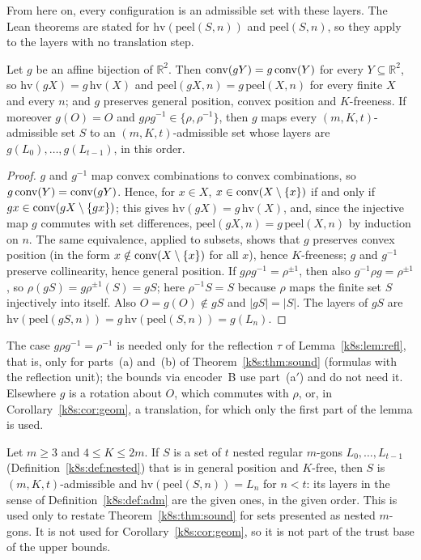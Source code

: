 From here on, every configuration is an admissible set with these layers. The Lean theorems are stated for
$\mathrm{hv}(\mathrm{peel}(S,n))$ and $\mathrm{peel}(S,n)$, so they apply to the layers with no translation step.

\begin{lemma}\label{k8s:lem:affine}
Let $g$ be an affine bijection of $\mathbb R^2$. Then $\operatorname{conv}(gY)=g\operatorname{conv}(Y)$ for every $Y\subseteq\mathbb R^2$, so
$\mathrm{hv}(gX)=g\,\mathrm{hv}(X)$ and $\mathrm{peel}(gX,n)=g\,\mathrm{peel}(X,n)$ for every finite $X$ and every $n$; and $g$
preserves general position, convex position and $K$-freeness. If moreover $g(O)=O$ and $g\rho g^{-1}\in\{\rho,\rho^{-1}\}$,
then $g$ maps every $(m,K,t)$-admissible set $S$ to an $(m,K,t)$-admissible set whose layers are
$g(L_0),\dots,g(L_{t-1})$, in this order.
\end{lemma}

\begin{proof}
$g$ and $g^{-1}$ map convex combinations to convex combinations, so $g\operatorname{conv}(Y)=\operatorname{conv}(gY)$. Hence, for $x\in X$,
$x\in\operatorname{conv}(X\setminus\{x\})$ if and only if $gx\in\operatorname{conv}(gX\setminus\{gx\})$; this gives $\mathrm{hv}(gX)=g\,\mathrm{hv}(X)$,
and, since the injective map $g$ commutes with set differences, $\mathrm{peel}(gX,n)=g\,\mathrm{peel}(X,n)$ by induction
on $n$. The same equivalence, applied to subsets, shows that $g$ preserves convex position (in the form
$x\notin\operatorname{conv}(X\setminus\{x\})$ for all $x$), hence $K$-freeness; $g$ and $g^{-1}$ preserve collinearity, hence general
position. If $g\rho g^{-1}=\rho^{\pm1}$, then also $g^{-1}\rho g=\rho^{\pm1}$, so $\rho(gS)=g\rho^{\pm1}(S)=gS$; here
$\rho^{-1}S=S$ because $\rho$ maps the finite set $S$ injectively into itself. Also $O=g(O)\notin gS$ and $|gS|=|S|$.
The layers of $gS$ are $\mathrm{hv}(\mathrm{peel}(gS,n))=g\,\mathrm{hv}(\mathrm{peel}(S,n))=g(L_n)$.
\end{proof}

The case $g\rho g^{-1}=\rho^{-1}$ is needed only for the reflection $\tau$ of Lemma~\ref{k8s:lem:refl}, that is, only
for parts~(a) and~(b) of Theorem~\ref{k8s:thm:sound} (formulas with the reflection unit); the bounds via encoder~B use
part~(a$'$) and do not need it. Elsewhere $g$ is a rotation about $O$, which commutes with $\rho$, or, in
Corollary~\ref{k8s:cor:geom}, a translation, for which only the first part of the lemma is used.

\begin{remark}\label{k8s:rem:ident}
Let $m\ge3$ and $4\le K\le2m$. If $S$ is a set of $t$ nested regular $m$-gons $L_0,\dots,L_{t-1}$
(Definition~\ref{k8s:def:nested}) that is in general position and $K$-free, then $S$ is $(m,K,t)$-admissible and
$\mathrm{hv}(\mathrm{peel}(S,n))=L_n$ for $n<t$: its layers in the sense of Definition~\ref{k8s:def:adm} are the given
ones, in the given order. This is used only to restate Theorem~\ref{k8s:thm:sound} for sets presented as nested
$m$-gons. It is not used for Corollary~\ref{k8s:cor:geom}, so it is not part of the trust base of the upper bounds.
\end{remark}

